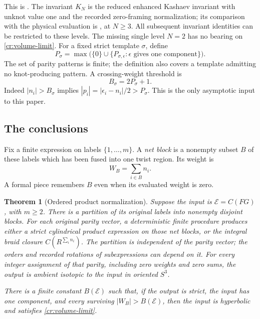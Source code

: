 \documentclass[11pt]{article}
\numberwithin{equation}{section}
\newtheorem{theorem}{Theorem}[section]
\theoremstyle{definition}\newtheorem{definition}[theorem]{Definition}
\theoremstyle{remark}\newtheorem{remark}[theorem]{Remark}
\begin{document}
This is \cite[Theorem 1.1]{Asymptotics}. The invariant $K_N$ is the reduced enhanced Kashaev invariant with unknot value one and the recorded zero-framing normalization; its comparison with the physical evaluation is \cite[Theorem 10.1]{Finite}, at $N\ge3$. All subsequent invariant identities can be restricted to these levels. The missing single level $N=2$ has no bearing on \eqref{cr:volume-limit}. For a fixed strict template $\sigma$, define
\[
 P_\sigma=\max\bigl(\{0\}\cup
   \{P_{\sigma,\epsilon}:\epsilon\text{ gives one component}\}\bigr).
\]
The set of parity patterns is finite; the definition also covers a template admitting no knot-producing pattern. A crossing-weight threshold is
\begin{equation}\label{cr:crossing-threshold}
                         B_\sigma=2P_\sigma+1.
\end{equation}
Indeed $|n_i|>B_\sigma$ implies $|p_i|=|\epsilon_i-n_i|/2>P_\sigma$. This is the only asymptotic input to this paper.

\subsection{The conclusions}

Fix a finite expression on labels $\{1,\ldots,m\}$. A \emph{net
block} is a nonempty subset $B$ of these labels which has been fused
into one twist region. Its weight is
\begin{equation}\label{cr:net}
                         W_B=\sum_{i\in B}n_i.
\end{equation}
A formal piece remembers $B$ even when its evaluated weight is zero.

\begin{theorem}[Ordered product normalization]\label{cr:ordered}
Suppose the input is $\mathcal E=C(FG)$, with $m\ge2$. There is a partition of its original labels into nonempty disjoint blocks. For each original parity vector, a deterministic finite procedure produces either a strict cylindrical product expression on those net blocks, or the integral braid closure $C(R^{\sum_i n_i})$. The partition is independent of the parity vector; the orders and recorded rotations of subexpressions can depend on it. For every integer assignment of that parity, including zero weights and zero sums, the output is ambient isotopic to the input in oriented $S^3$.

There is a finite constant $B(\mathcal E)$ such that, if the output is strict, the input has one component, and every surviving $|W_B|>B(\mathcal E)$, then the input is hyperbolic and satisfies \eqref{cr:volume-limit}.
\end{theorem}
\end{document}
